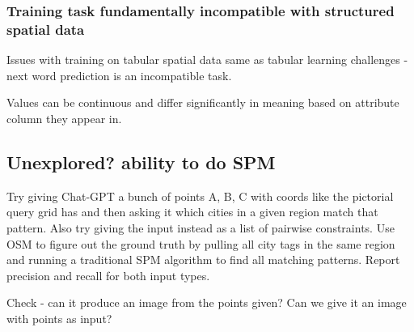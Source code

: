    \subsubsection{Training task fundamentally incompatible with structured spatial data}
        Issues with training on tabular spatial data same as tabular learning challenges - next word prediction is an incompatible task.
        
        Values can be continuous and differ significantly in meaning based on attribute column they appear in.
        


\subsection{Unexplored? ability to do SPM}
Try giving Chat-GPT a bunch of points A, B, C with coords like the pictorial query grid has and then asking it which cities in a given region match that pattern.
Also try giving the input instead as a list of pairwise constraints.
Use OSM to figure out the ground truth by pulling all city tags in the same region and running a traditional SPM algorithm to find all matching patterns.
Report precision and recall for both input types.

Check - can it produce an image from the points given? Can we give it an image with points as input?